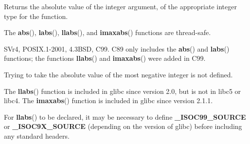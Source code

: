 \documentclass[]{article}
\let\realtextbf=\textbf
\renewcommand{\textbf}[1]{\textcolor{boldcolor}{\realtextbf{#1}}}
\begin{document}

Returns the absolute value of the integer argument, of the appropriate
integer type for the function.



The \textbf{abs}(), \textbf{labs}(), \textbf{llabs}(), and
\textbf{imaxabs}() functions are thread-safe.


SVr4, POSIX.1-2001, 4.3BSD, C99. C89 only includes the \textbf{abs}()
and \textbf{labs}() functions; the functions \textbf{llabs}() and
\textbf{imaxabs}() were added in C99.


Trying to take the absolute value of the most negative integer is not
defined.

The \textbf{llabs}() function is included in glibc since version 2.0,
but is not in libc5 or libc4. The \textbf{imaxabs}() function is
included in glibc since version 2.1.1.

For \textbf{llabs}() to be declared, it may be necessary to define
\textbf{\_ISOC99\_SOURCE} or \textbf{\_ISOC9X\_SOURCE} (depending on the
version of glibc) before including any standard headers.
\end{document}
